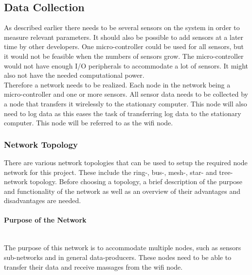 








\subsection{Data Collection}
\label{sec:data_collection}
As described earlier there needs to be several sensors on the system in order to measure relevant parameters.
It should also be possible to add sensors at a later time by other developers. 
One micro-controller could be used for all sensors, but it would not be feasible when the numbers of sensors grow. 
The micro-controller would not have enough I/O peripherals to accommodate a lot of sensors. 
It might also not have the needed computational power. 
\\
Therefore a network needs to be realized. Each node in the network being a micro-controller and one or more sensors.
All sensor data needs to be collected by a node that transfers it wirelessly to the stationary computer.
This node will also need to log data as this eases the task of transferring log data to the stationary computer.
This node will be referred to as the wifi node.

\subsubsection{Network Topology}

There are various network topologies that can be used to setup the required node network for this project.
These include the ring-, bus-, mesh-, star- and tree-network topology. 
Before choosing a topology, a brief description of the purpose and functionality of the network as well as an overview of their advantages and disadvantages are needed. 

\paragraph{Purpose of the Network}~\\
The purpose of this network is to accommodate multiple nodes, such as sensors sub-networks and in general data-producers.
These nodes need to be able to transfer their data and receive massages from the wifi node.

